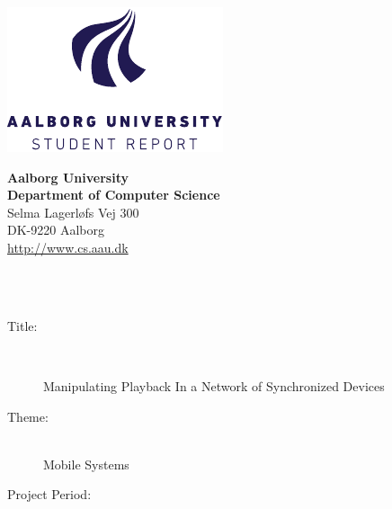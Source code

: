 \begin{titlepage}
    \begin{minipage}{0.4\textwidth}
        \centering
        \includegraphics[width=\textwidth]{img/aau_logo_en.pdf}
    \end{minipage} \hfill
    \begin{minipage}{0.4\textwidth}
        \flushright
        \textbf{Aalborg University}\\
        \textbf{Department of Computer Science}\\
        Selma Lagerløfs Vej 300\\
        DK-9220 Aalborg\\
        \url{http://www.cs.aau.dk}
    \end{minipage}\\
    \vspace{1cm}\\
    \begin{minipage}[t]{0.35\textwidth}
        \begin{description}
            \item[Title:] \hfill\\
                \vspace{-0.8cm}
                \begin{flushleft}
                    Manipulating Playback In a Network of Synchronized Devices
                \end{flushleft}
            \item[Theme:] \hfill\\
                Mobile Systems
            \item[Project Period:] \hfill\\

\end{description}
\end{minipage}
\end{titlepage}
